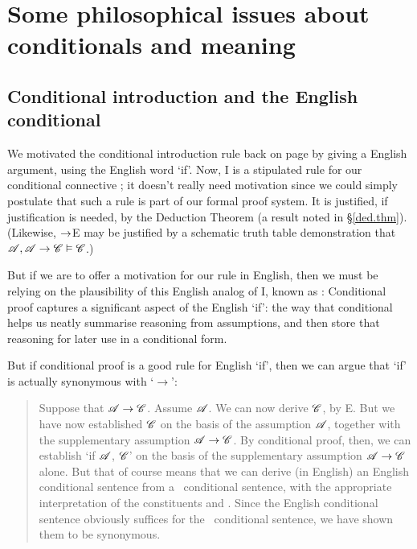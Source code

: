 \chapter{Some philosophical issues about conditionals and meaning}


\section{Conditional introduction and the English conditional} \label{cond.proof}%

We motivated the conditional introduction rule back on page \pageref{ci.motivate} by giving a English argument, using the English word `if'. Now, {\eif}I is a stipulated rule for our conditional connective \eif; it doesn't really need motivation since we could simply postulate that such a rule is part of our formal proof system. It is justified, if justification is needed, by the Deduction Theorem (a result noted in §\ref{ded.thm}). (Likewise, $\rightarrow$E may be justified by a schematic truth table demonstration that $\mathscr{A}, \mathscr{A}\rightarrow\mathscr{C} \vDash \mathscr{C}$.)

But if we are to offer a motivation for our rule in English, then we must be relying on the plausibility of this English analog of {\eif}I, known as :  Conditional proof captures a significant aspect of the English `if': the way that  conditional helps us neatly summarise reasoning from assumptions, and then store that reasoning for later use in a conditional form.



But if conditional proof is a good rule for English `if', then we can argue that `if' is actually synonymous with `$\to$':\ \begin{quote}
Suppose that $\mathscr{A} \rightarrow \mathscr{C}$. Assume $\mathscr{A}$. We can now derive $\mathscr{C}$, by {\eif}E. But we have now established $\mathscr{C}$ on the basis of the assumption $\mathscr{A}$, together with the supplementary assumption $\mathscr{A}\rightarrow \mathscr{C}$. By conditional proof, then, we can establish `if $\mathscr{A}$, $\mathscr{C}$' on the basis of the supplementary assumption $\mathscr{A}\rightarrow \mathscr{C}$ alone. But that of course means that we can derive (in English) an English conditional sentence from a \TFL\ conditional sentence, with the appropriate interpretation of the constituents  and . Since the English conditional sentence obviously suffices for the \TFL\ conditional sentence, we have shown them to be synonymous. 
\end{quote}  

